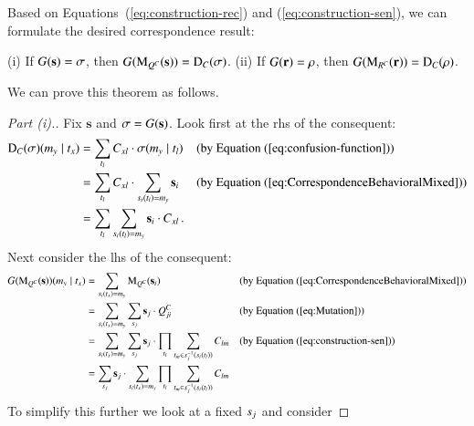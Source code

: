 \documentclass[fleqn,reqno,10pt]{article}
\renewcommand{\Smixed}{\ensuremath{\mathrm{\mathbf{s}}}}
\renewcommand{\Rmixed}{\ensuremath{\mathrm{\mathbf{r}}}}
\newcommand{\Diff}{\ensuremath{\mathrm{D}}} %
\newcommand{\Mutate}{\ensuremath{\mathrm{M}}} %
\begin{document}
Based on Equations~(\ref{eq:construction-rec}) and
(\ref{eq:construction-sen}), we can formulate the desired
correspondence result:

\begin{theorem}
  \label{thm:Correspondence}
  (i) If $G(\Smixed) = \Sstrat$, then $G(\Mutate_{Q^C}(\Smixed)) =
  \Diff_C(\Sstrat)$. (ii) If $G(\Rmixed) = \Rstrat$, then
  $G(\Mutate_{R^C}(\Rmixed)) = \Diff_C(\Rstrat)$.
\end{theorem}

We can prove this theorem as follows.

\begin{proof}[Part (i).]
  Fix $\Smixed$ and $\Sstrat = G(\Smixed)$. Look first at the rhs of
  the consequent:
  \begin{align*}
    \Diff_C(\Sstrat)(\messg_y \probbar \state_x) & =  \sum_{\state_l} C_{xl}
    \cdot \Sstrat(\messg_y \probbar \state_l) && \text{(by Equation~(\ref{eq:confusion-function}))} \\
    & =  \sum_{\state_l} C_{xl}
    \cdot  \sum_{\Spure_i(\state_l) = \messg_y} \Smixed_i && \text{(by Equation~(\ref{eq:CorrespondenceBehavioralMixed}))} \\
    & = \sum_{\state_l}
    \sum_{\Spure_i(\state_l) = \messg_y} \Smixed_i \cdot C_{xl}\,.
  \end{align*}
  Next consider the lhs of the consequent:
  \begin{align*}
    G(\Mutate_{Q^C}(\Smixed))(\messg_y \probbar \state_x) & =
    \sum_{\Spure_i(\state_x)=\messg_y} \Mutate_{Q^C}(\Smixed_i) &&
    \text{(by Equation~(\ref{eq:CorrespondenceBehavioralMixed}))} \\
    & = \sum_{\Spure_i(\state_x)=\messg_y} \sum_{\Spure_j}
    \Smixed_j \cdot Q^C_{ji} &&
    \text{(by Equation~(\ref{eq:Mutation}))} \\
    & = \sum_{\Spure_i(\state_x)=\messg_y} \sum_{\Spure_j}
    \Smixed_j \cdot \prod_{\state_l} \sum_{\state_m \in
      \Spure_j^{-1}(\Spure_i(\state_l))} C_{lm} &&
    \text{(by Equation~(\ref{eq:construction-sen}))} \\
    & = \sum_{\Spure_j} \Smixed_j \cdot
    \sum_{\Spure_i(\state_x)=\messg_y} \prod_{\state_l}
    \sum_{\state_m \in \Spure_j^{-1}(\Spure_i(\state_l))} C_{lm}
  \end{align*}
  To simplify this further we look at a fixed $s_j$ and consider

\end{proof}
\end{document}
